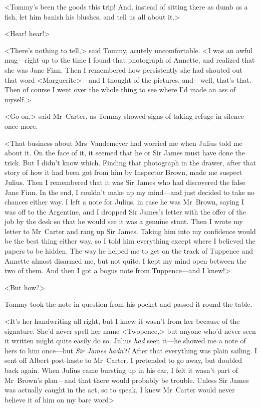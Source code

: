 <Tommy's been the goods this trip! And, instead of sitting there as dumb as a fish, let him banish his blushes, and tell us all about it.>

<Hear! hear!>

<There's nothing to tell,> said Tommy, acutely uncomfortable. <I was an awful mug—right up to the time I found that photograph of Annette, and realized that she was Jane Finn. Then I remembered how persistently she had shouted out that word <Marguerite>—and I thought of the pictures, and—well, that's that. Then of course I went over the whole thing to see where I'd made an ass of myself.>

<Go on,> said Mr~Carter, as Tommy showed signs of taking refuge in silence once more.

<That business about Mrs~Vandemeyer had worried me when Julius told me about it. On the face of it, it seemed that he or Sir James must have done the trick. But I didn't know which. Finding that photograph in the drawer, after that story of how it had been got from him by Inspector Brown, made me suspect Julius. Then I remembered that it was Sir James who had discovered the false Jane Finn. In the end, I couldn't make up my mind—and just decided to take no chances either way. I left a note for Julius, in case he was Mr~Brown, saying I was off to the Argentine, and I dropped Sir James's letter with the offer of the job by the desk so that he would see it was a genuine stunt. Then I wrote my letter to Mr~Carter and rang up Sir James. Taking him into my confidence would be the best thing either way, so I told him everything except where I believed the papers to be hidden. The way he helped me to get on the track of Tuppence and Annette almost disarmed me, but not quite. I kept my mind open between the two of them. And then I got a bogus note from Tuppence—and I knew!>

<But how?>

Tommy took the note in question from his pocket and passed it round the table.

<It's her handwriting all right, but I knew it wasn't from her because of the signature. She'd never spell her name <Twopence,> but anyone who'd never seen it written might quite easily do so. Julius \emph{had} seen it—he showed me a note of hers to him once—but \emph{Sir James hadn't!} After that everything was plain sailing. I sent off Albert post-haste to Mr~Carter. I pretended to go away, but doubled back again. When Julius came bursting up in his car, I felt it wasn't part of Mr~Brown's plan—and that there would probably be trouble. Unless Sir James was actually caught in the act, so to speak, I knew Mr~Carter would never believe it of him on my bare word\longdash>

